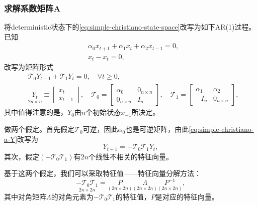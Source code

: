 \subsubsection{求解系数矩阵A}
将deterministic状态下的\eqref{eq:simple-christiano-state-space}改写为如下AR(1)过程。已知
\begin{equation*}
  \begin{split}
    &\alpha_0 x_{t+1} + \alpha_1 x_t + \alpha_2 x_{t-1}=0, \\
    &x_t - x_t=0,
  \end{split}
\end{equation*}
改写为矩阵形式
\begin{equation}
  \label{eq:simple-christiano-a-Y}
\begin{split}
  &\mathcal{T}_0 Y_{t+1} + \mathcal{T}_1 Y_t  = 0, \quad \forall t\ge 0, \\
  & \underset{2n \times n}{Y_t} \equiv \begin{bmatrix}
  x_t \\ x_{t-1}
  \end{bmatrix},  \quad \mathcal{T}_0 = \begin{bmatrix}
  \alpha_0 & 0_{n \times n}\\
  0_{n \times n} & I_n
\end{bmatrix}, \quad \mathcal{T}_1 = \begin{bmatrix}
\alpha_1 & \alpha_2 \\
-I_{n} & 0_{n \times n}
\end{bmatrix},
\end{split}
\end{equation}
其中值得注意的是，$Y_0$由$n$个初始状态$x_{-1}$所决定。

做两个假定。首先假定$\mathcal{T}_0$可逆，因此$\alpha_0$也是可逆矩阵，由此\eqref{eq:simple-christiano-a-Y}改写为
\begin{equation}
  \label{eq:simple-christiano-Y-tau0}
  {Y_{t+1}} = - \mathcal{T}_{0} \mathcal{T}_1 Y_t,
\end{equation}
其次，假定$\left( - \mathcal{T}_{0} \mathcal{T}_1 \right)$有$2n$个线性不相关的特征向量。

基于这两个假定，我们可以采取特征值——特征向量分解方法：
\begin{equation}
  \label{eq:simple-christiano-tau0-tau1}
  \underset{2n \times 2n}{- \mathcal{T}_{0} \mathcal{T}_1} = \underset{(2n \times 2n)}{P} \underset{(2n \times 2n)}{\Lambda} \underset{(2n \times 2n)}{P^{-1}},
\end{equation}
其中对角矩阵$\Lambda$的对角元素为$- \mathcal{T}_{0} \mathcal{T}_1$的特征值，$P$是对应的特征向量。

